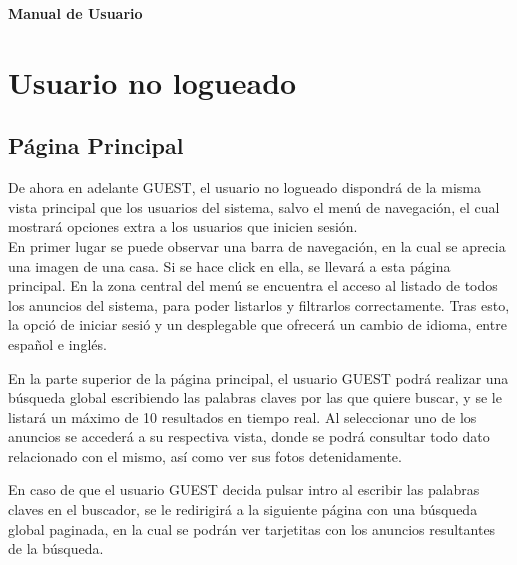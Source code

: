 \newpage{\pagestyle{empty}\cleardoublepage}
\newpage
\vspace*{\fill}
    \begin{center}
      \thispagestyle{empty} \vspace*{0cm} \textbf{\huge
Manual de Usuario}
    \end{center}
    \vspace*{\fill}
\newpage{\pagestyle{empty}\cleardoublepage}
\chapter{Usuario no logueado}

\section{P\'{a}gina Principal}
De ahora en adelante GUEST, el usuario no logueado dispondr\'{a} de la misma vista principal que los usuarios del sistema, salvo el men\'{u} de navegaci\'{o}n, el cual mostrar\'{a} opciones extra a los usuarios que inicien sesi\'{o}n.\\



En primer lugar se puede observar una barra de navegaci\'{o}n, en la cual se aprecia una imagen de una casa. Si se hace click en ella, se llevar\'{a} a esta p\'{a}gina principal. En la zona central del men\'{u} se encuentra el acceso al listado de todos los anuncios del sistema, para poder listarlos y filtrarlos correctamente. Tras esto, la opci\'{o} de iniciar sesi\'{o} y un desplegable que ofrecer\'{a} un cambio de idioma, entre espa\~{n}ol e ingl\'{e}s.



En la parte superior de la p\'{a}gina principal, el usuario GUEST podr\'{a} realizar una b\'{u}squeda global escribiendo las palabras claves por las que quiere buscar, y se le listar\'{a} un m\'{a}ximo de 10 resultados en tiempo real. Al seleccionar uno de los anuncios se acceder\'{a} a su respectiva vista, donde se podr\'{a} consultar todo dato relacionado con el mismo, as\'{i} como ver sus fotos detenidamente.



En caso de que el usuario GUEST decida pulsar intro al escribir las palabras claves en el buscador, se le redirigir\'{a} a la siguiente p\'{a}gina con una b\'{u}squeda global paginada, en la cual se podr\'{a}n ver tarjetitas con los anuncios resultantes de la b\'{u}squeda.

